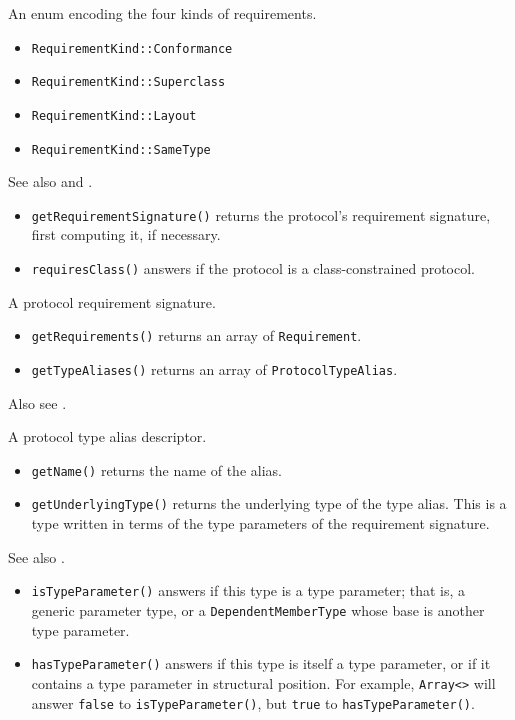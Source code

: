 \documentclass[../generics]{subfiles}
\begin{document}
An enum encoding the four kinds of requirements.
\begin{itemize}
\item \texttt{RequirementKind::Conformance}
\item \texttt{RequirementKind::Superclass}
\item \texttt{RequirementKind::Layout}
\item \texttt{RequirementKind::SameType}
\end{itemize}

See also  and .
\begin{itemize}
\item \texttt{getRequirementSignature()} returns the protocol's requirement signature, first computing it, if necessary.
\item \texttt{requiresClass()} answers if the protocol is a class-constrained protocol.
\end{itemize}

A protocol requirement signature.
\begin{itemize}
\item \texttt{getRequirements()} returns an array of \texttt{Requirement}.
\item \texttt{getTypeAliases()} returns an array of \texttt{ProtocolTypeAlias}.
\end{itemize}
Also see .

A protocol type alias descriptor.
\begin{itemize}
\item \texttt{getName()} returns the name of the alias.
\item \texttt{getUnderlyingType()} returns the underlying type of the type alias. This is a type written in terms of the type parameters of the requirement signature.
\end{itemize}

See also .
\begin{itemize}
\item \texttt{isTypeParameter()} answers if this type is a type parameter; that is, a generic parameter type, or a \texttt{DependentMemberType} whose base is another type parameter.
\item \texttt{hasTypeParameter()} answers if this type is itself a type parameter, or if it contains a type parameter in structural position. For example, \texttt{Array<>} will answer \texttt{false} to \texttt{isTypeParameter()}, but \texttt{true} to \texttt{hasTypeParameter()}. 
\end{itemize}
\end{document}
